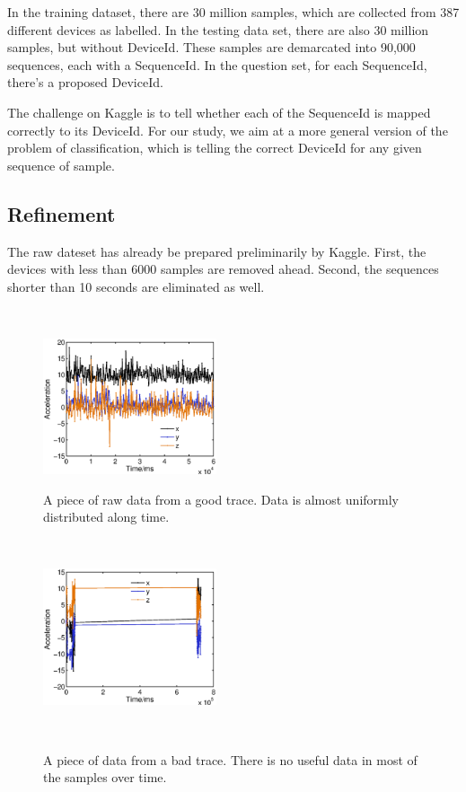 \documentclass{article} %
\begin{document}
In the training dataset, there are 30 million samples, which are collected from 387 different devices as labelled. In the testing data set, there are also 30 million samples, but without DeviceId. These samples are demarcated into 90,000 sequences, each with a SequenceId. In the question set, for each SequenceId, there's a proposed DeviceId.

The challenge on Kaggle is to tell whether each of the SequenceId is mapped correctly to its DeviceId. For our study, we aim at a more general version of the problem of classification, which is telling the correct DeviceId for any given sequence of sample.

\subsection{Refinement}
The raw dateset has already be prepared preliminarily by Kaggle. First, the devices with less than 6000 samples are removed ahead. Second, the sequences shorter than 10 seconds are eliminated as well. 

\begin{figure}
    \hspace{-0.5cm}
    \begin{minipage}[t]{0.02\textwidth}~
    \end{minipage}
    \begin{minipage}[t]{0.47\textwidth}
    \centering
    \includegraphics[height=40mm]{fig/good_raw.eps}
    \caption{A piece of raw data from a good trace. Data is almost uniformly distributed along time. }
    \label{fig:good_raw}
    \end{minipage}
    \begin{minipage}[t]{0.02\textwidth}~
    \end{minipage}
    \begin{minipage}[t]{0.47\textwidth}
    \centering
    \includegraphics[height=40mm]{fig/bad_raw.eps}\\
    \caption{A piece of data from a bad trace. There is no useful data in most of the samples over time. }
    \label{fig:bad_raw}
    \end{minipage}
    \begin{minipage}[t]{0.02\textwidth}~
    \end{minipage}%
 \end{figure}
\end{document}
